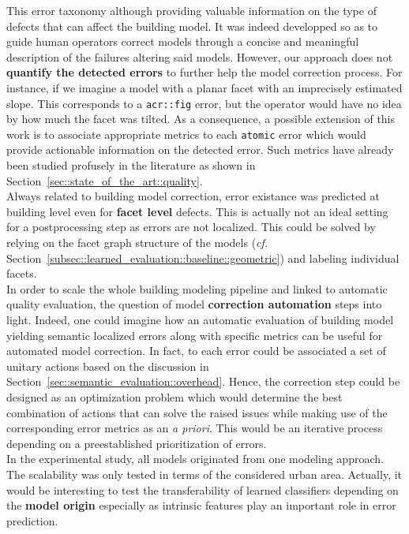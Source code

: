     This error taxonomy although providing valuable information on the type of defects that can affect the building model.
    It was indeed developped so as to guide human operators correct models through a concise and meaningful description of the failures altering said models.
    However, our approach does not \textbf{quantify the detected errors} to further help the model correction process.
    For instance, if we imagine a model with a planar facet with an imprecisely estimated slope.
    This corresponds to a \texttt{\acrfull{acr::fig}} error, but the operator would have no idea by how much the facet was tilted.
    As a consequence, a possible extension of this work is to associate appropriate metrics to each \texttt{atomic} error which would provide actionable information on the detected error.
    Such metrics have already been studied profusely in the literature as shown in Section~\ref{sec::state_of_the_art::quality}.\\

    Always related to building model correction, error existance was predicted at building level even for \textbf{facet level} defects.
    This is actually not an ideal setting for a postprocessing step as errors are not localized.
    This could be solved by relying on the facet graph structure of the models (\textit{cf.} Section~\ref{subsec::learned_evaluation::baseline::geometric}) and labeling individual facets.\\

    In order to scale the whole building modeling pipeline and linked to automatic quality evaluation, the question of model \textbf{correction automation} steps into light.
    Indeed, one could imagine how an automatic evaluation of building model yielding semantic localized errors along with specific metrics can be useful for automated model correction.
    In fact, to each error could be associated a set of unitary actions based on the discussion in Section~\ref{sec::semantic_evaluation::overhead}.
    Hence, the correction step could be designed as an optimization problem which would determine the best combination of actions that can solve the raised issues while making use of the corresponding error metrics as an \textit{a priori}.
    This would be an iterative process depending on a preestablished prioritization of errors.\\
    
    In the experimental study, all models originated from one modeling approach.
    The scalability was only tested in terms of the considered urban area.
    Actually, it would be interesting to test the transferability of learned classifiers depending on the \textbf{model origin} especially as intrinsic features play an important role in error prediction.\\

